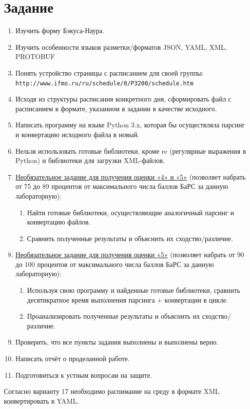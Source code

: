 \documentclass[11pt]{article}
\begin{document}
\section{Задание}
\begin{enumerate}
	\item Изучить форму Бэкуса-Наура.
	\item Изучить особенности языков разметки/форматов JSON, YAML, XML,
	PROTOBUF
	\item Понять устройство страницы с расписанием для своей группы:\\
		\texttt{http://www.ifmo.ru/ru/schedule/0/P3200/schedule.htm}
	\item Исходя из структуры расписания конкретного дня, сформировать
	файл с расписанием в формате, указанном в задании в качестве
	исходного.
	\item Написать программу на языке Python 3.x, которая бы осуществляла
	парсинг и конвертацию исходного файла в новый.
	\item Нельзя использовать готовые библиотеки, кроме re (регулярные
	выражения в Python) и библиотеки для загрузки XML-файлов.
	\item \underline{Необязательное задание для получения оценки «4» и «5»} (позволяет
	набрать от 75 до 89 процентов от максимального числа баллов БаРС
	за данную лабораторную):
	\begin{enumerate}
		\item Найти готовые библиотеки, осуществляющие аналогичный
		парсинг и конвертацию файлов.
		\item Сравнить полученные результаты и объяснить их
		сходство/различие.
	\end{enumerate}
	\item \underline{Необязательное задание для получения оценки «5»} (позволяет набрать
	от 90 до 100 процентов от максимального числа баллов БаРС за
	данную лабораторную):
	\begin{enumerate}
		\item Используя свою программу и найденные готовые
		библиотеки, сравнить десятикратное время выполнения
		парсинга + конвертации в цикле.
		\item Проанализировать полученные результаты и объяснить их
		сходство/различие.
	\end{enumerate}
	\item Проверить, что все пункты задания выполнены и выполнены верно.
	\item Написать отчёт о проделанной работе.
	\item Подготовиться к устным вопросам на защите.
\end{enumerate}
Согласно варианту 17 необходимо распимание на среду в формате XML конвертировать в YAML.
\pagebreak
\large
\end{document}
